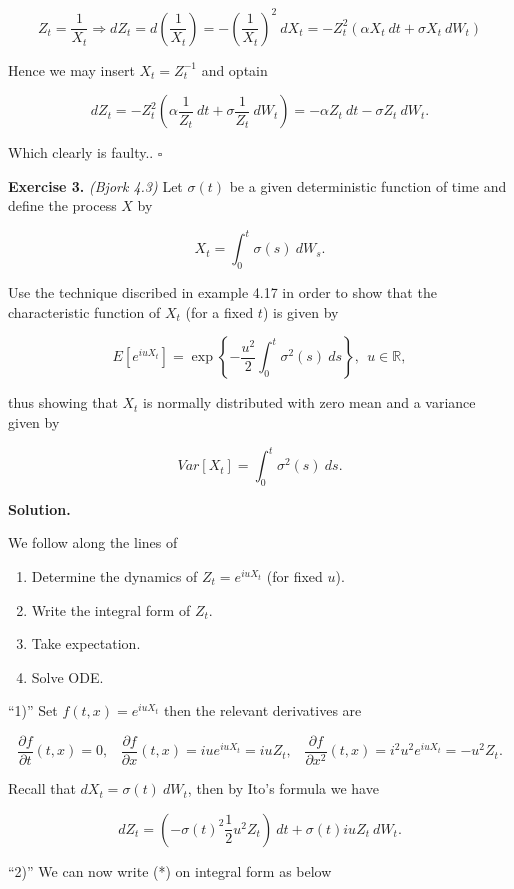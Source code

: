 \documentclass[a4paper,12pt,openany]{book}
\providecommand{\tightlist}{%
 \setlength{\itemsep}{0pt}\setlength{\parskip}{0pt}}
\begin{document}
\[
Z_t=\frac{1}{X_t}\Rightarrow dZ_t=d\left(\frac{1}{X_t}\right)=-\left(\frac{1}{X_t}\right)^2\ dX_t=-Z_t^2(\alpha X_t\ dt+\sigma X_t\ dW_t)
\]

Hence we may insert \(X_t=Z_t^{-1}\) and optain

\[
dZ_t=-Z_t^2\left(\alpha\frac{1}{Z_t}\ dt + \sigma \frac{1}{Z_t}\ dW_t\right)=-\alpha Z_t\ dt-\sigma Z_t\ dW_t.
\]

Which clearly is faulty.. \(\square\)

\textbf{Exercise 3.} \emph{(Bjork 4.3)} Let \(\sigma(t)\) be a given deterministic function of time and define the process \(X\) by

\[
X_t=\int_0^t\sigma(s)\ dW_s.
\]

Use the technique discribed in example 4.17 in order to show that the characteristic function of \(X_t\) (for a fixed \(t\)) is given by

\[
E[e^{iuX_t}]=\exp\left\{-\frac{u^2}{2}\int_0^t\sigma^2(s)\ ds\right\},\ \ u\in\mathbb{R},
\]

thus showing that \(X_t\) is normally distributed with zero mean and a variance given by

\[
Var[X_t]=\int_0^t\sigma^2(s)\ ds.
\]

\textbf{Solution.}

We follow along the lines of

\begin{enumerate}
\def\labelenumi{\arabic{enumi}.}
\tightlist
\item
  Determine the dynamics of \(Z_t=e^{iuX_t}\) (for fixed \(u\)).
\item
  Write the integral form of \(Z_t\).
\item
  Take expectation.
\item
  Solve ODE.
\end{enumerate}

``1)'' Set \(f(t,x)=e^{iuX_t}\) then the relevant derivatives are

\[
\frac{\partial f}{\partial t}(t,x)=0,\hspace{10pt}\frac{\partial f}{\partial x}(t,x) =iue^{iuX_t}=iuZ_t,\hspace{10pt}\frac{\partial f}{\partial x^2}(t,x) =i^2u^2e^{iuX_t}=-u^2Z_t.
\]

Recall that \(dX_t=\sigma(t)\ dW_t\), then by Ito's formula we have

\[
dZ_t=\left(-\sigma(t)^2\frac{1}{2}u^2Z_t\right)\ dt+\sigma(t)iuZ_t\ dW_t.\tag{*}
\]

``2)'' We can now write (*) on integral form as below
\end{document}
